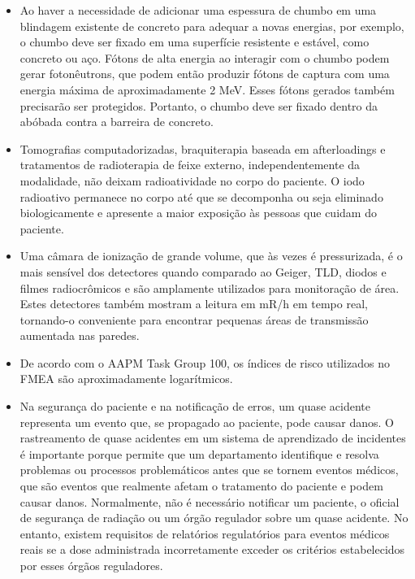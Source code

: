 \documentclass[11pt,a4paper]{article}
\newcounter{exemplo}
\begin{document}
\begin{exemplo}
    \begin{itemize}
        \item Ao haver a necessidade de adicionar uma espessura de chumbo em uma blindagem existente de concreto para adequar a novas energias, por exemplo, o chumbo deve ser fixado em uma superfície resistente e estável, como concreto ou aço. Fótons de alta energia ao interagir com o chumbo podem gerar fotonêutrons, que podem então produzir fótons de captura com uma energia máxima de aproximadamente 2 MeV. Esses fótons gerados também precisarão ser protegidos. Portanto, o chumbo deve ser fixado dentro da abóbada contra a barreira de concreto.
        
        \item Tomografias computadorizadas, braquiterapia baseada em afterloadings e tratamentos de radioterapia de feixe externo, independentemente da modalidade, não deixam radioatividade no corpo do paciente. O iodo radioativo permanece no corpo até que se decomponha ou seja eliminado biologicamente e apresente a maior exposição às pessoas que cuidam do paciente.
        
        \item Uma câmara de ionização de grande volume, que às vezes é pressurizada, é o mais sensível dos detectores quando comparado ao Geiger, TLD, diodos e filmes radiocrômicos e são amplamente utilizados para monitoração de área. Estes detectores também mostram a leitura em mR/h em tempo real, tornando-o conveniente para encontrar pequenas áreas de transmissão aumentada nas paredes.
        
        \item De acordo com o AAPM Task Group 100, os índices de risco utilizados no FMEA são aproximadamente logarítmicos.
        
        \item Na segurança do paciente e na notificação de erros, um quase acidente representa um evento que, se propagado ao paciente, pode causar danos. O rastreamento de quase acidentes em um sistema de aprendizado de incidentes é importante porque permite que um departamento identifique e resolva problemas ou processos problemáticos antes que se tornem eventos médicos, que são eventos que realmente afetam o tratamento do paciente e podem causar danos. Normalmente, não é necessário notificar um paciente, o oficial de segurança de radiação ou um órgão regulador sobre um quase acidente. No entanto, existem requisitos de relatórios regulatórios para eventos médicos reais se a dose administrada incorretamente exceder os critérios estabelecidos por esses órgãos reguladores.
        

\end{itemize}
\end{exemplo}
\end{document}
